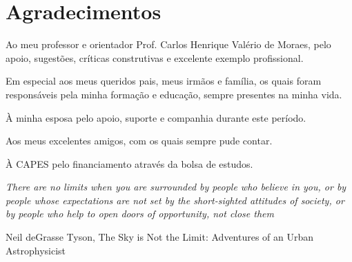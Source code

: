 \chapter*{Agradecimentos}

Ao meu professor e orientador Prof. Carlos Henrique Valério de Moraes, pelo apoio, sugestões, críticas construtivas e excelente exemplo profissional.

Em especial aos meus queridos pais, meus irmãos e família, os quais foram responsáveis pela minha formação e educação, sempre presentes na minha vida.

À minha esposa pelo apoio, suporte e companhia durante este período.

Aos meus excelentes amigos, com os quais sempre pude contar.

À CAPES pelo financiamento através da bolsa de estudos.

\vfill

\hfill

\begin{flushright}

\small
\parbox{.6\textwidth}{\emph{There are no limits when you are surrounded by people who believe in you, or by people whose expectations are not set by the short-sighted attitudes of society, or by people who help to open doors of opportunity, not close them}}

Neil deGrasse Tyson, The Sky is Not the Limit: Adventures of an Urban Astrophysicist

\end{flushright}